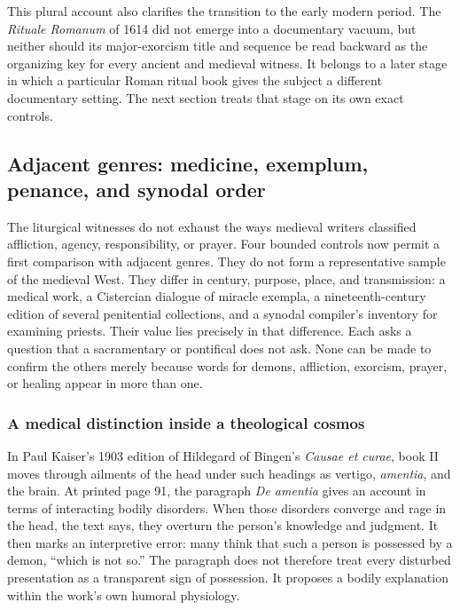 This plural account also clarifies the transition to the early modern period.
The \emph{Rituale Romanum} of 1614 did not emerge into a documentary vacuum,
but neither should its major-exorcism title and sequence be read backward as
the organizing key for every ancient and medieval witness. It belongs to a
later stage in which a particular Roman ritual book gives the subject a
different documentary setting. The next section treats that stage on its own
exact controls.

\subsection{Adjacent genres: medicine, exemplum, penance, and synodal order}

The liturgical witnesses do not exhaust the ways medieval writers classified
affliction, agency, responsibility, or prayer. Four bounded controls now permit
a first comparison with adjacent genres. They do not form a representative
sample of the medieval West. They differ in century, purpose, place, and
transmission: a medical work, a Cistercian dialogue of miracle exempla, a
nineteenth-century edition of several penitential collections, and a synodal
compiler's inventory for examining priests. Their value lies precisely in that
difference. Each asks a question that a sacramentary or pontifical does not ask.
None can be made to confirm the others merely because words for demons,
affliction, exorcism, prayer, or healing appear in more than one.

\subsubsection{A medical distinction inside a theological cosmos}

In Paul Kaiser's 1903 edition of Hildegard of Bingen's \emph{Causae et
curae}, book II moves through ailments of the head under such headings as
vertigo, \emph{amentia}, and the brain. At printed page 91, the paragraph
\emph{De amentia} gives an account in terms of interacting bodily disorders.
When those disorders converge and rage in the head, the text says, they overturn
the person's knowledge and judgment. It then marks an interpretive error:
many think that such a person is possessed by a demon, ``which is not so.''
The paragraph does not therefore treat every disturbed presentation as a
transparent sign of possession. It proposes a bodily explanation within the
work's own humoral physiology.

